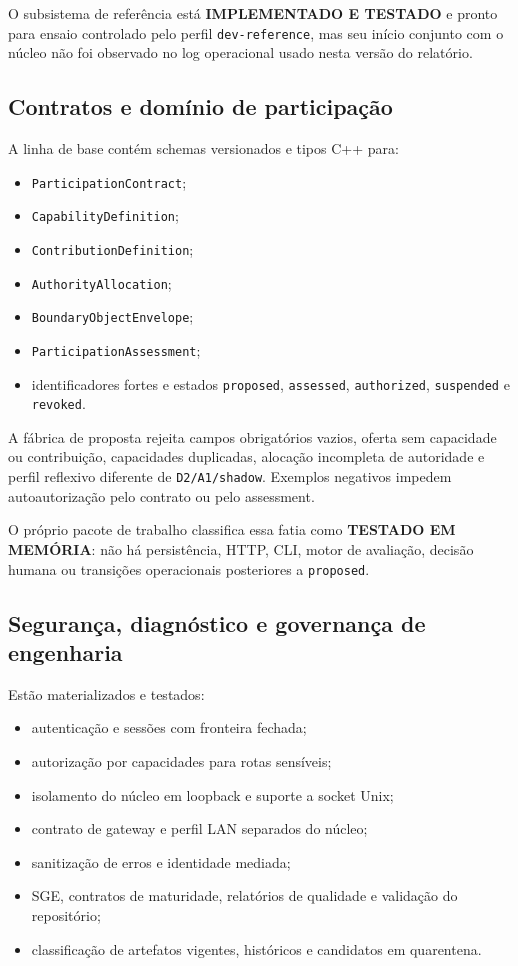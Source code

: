 \documentclass[11pt,a4paper,oneside]{article}
\newcommand{\statustestado}{\textcolor{sisterblue}{\textbf{IMPLEMENTADO E TESTADO}}}
\newcommand{\statusmemoria}{\textcolor{sisterpurple}{\textbf{TESTADO EM MEMÓRIA}}}
\begin{document}
\begin{pendencia}
O subsistema de referência está \statustestado{} e pronto para ensaio controlado pelo perfil \texttt{dev-reference}, mas seu início conjunto com o núcleo não foi observado no log operacional usado nesta versão do relatório.
\end{pendencia}

\subsection{Contratos e domínio de participação}

A linha de base contém schemas versionados e tipos C++ para:

\begin{itemize}
  \item \texttt{ParticipationContract};
  \item \texttt{CapabilityDefinition};
  \item \texttt{ContributionDefinition};
  \item \texttt{AuthorityAllocation};
  \item \texttt{BoundaryObjectEnvelope};
  \item \texttt{ParticipationAssessment};
  \item identificadores fortes e estados \texttt{proposed}, \texttt{assessed}, \texttt{authorized}, \texttt{suspended} e \texttt{revoked}.
\end{itemize}

A fábrica de proposta rejeita campos obrigatórios vazios, oferta sem capacidade ou contribuição, capacidades duplicadas, alocação incompleta de autoridade e perfil reflexivo diferente de \texttt{D2/A1/shadow}. Exemplos negativos impedem autoautorização pelo contrato ou pelo assessment.

O próprio pacote de trabalho classifica essa fatia como \statusmemoria{}: não há persistência, HTTP, CLI, motor de avaliação, decisão humana ou transições operacionais posteriores a \texttt{proposed}.

\subsection{Segurança, diagnóstico e governança de engenharia}

Estão materializados e testados:

\begin{itemize}
  \item autenticação e sessões com fronteira fechada;
  \item autorização por capacidades para rotas sensíveis;
  \item isolamento do núcleo em loopback e suporte a socket Unix;
  \item contrato de gateway e perfil LAN separados do núcleo;
  \item sanitização de erros e identidade mediada;
  \item SGE, contratos de maturidade, relatórios de qualidade e validação do repositório;
  \item classificação de artefatos vigentes, históricos e candidatos em quarentena.
\end{itemize}
\end{document}

